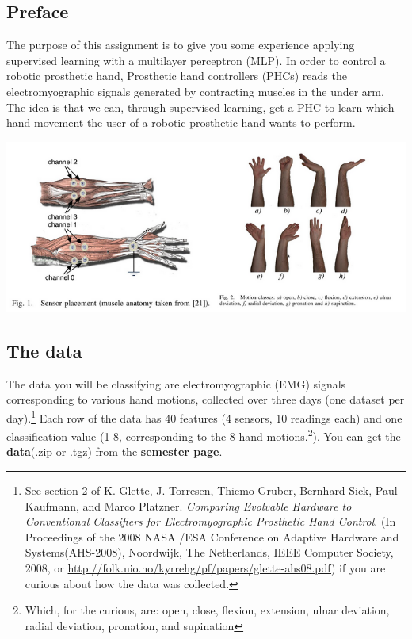 \documentclass{article}           %
\begin{document}
\subsection*{Preface}
The purpose of this assignment is to give you some experience applying supervised learning with a multilayer perceptron (MLP).
In order to control a robotic prosthetic hand, Prosthetic hand controllers (PHCs) reads the electromyographic signals generated by contracting muscles in the under arm.
The idea is that we can, through supervised learning, get a PHC to learn which hand movement the user of a robotic prosthetic hand wants to perform.

\begin{center}
    \includegraphics[scale=0.7]{figures/handfigures.png}
\end{center}

\subsection*{The data}
 The data you will be classifying
are electromyographic (EMG) signals corresponding to various hand
motions, collected over three days (one dataset per day).\footnote{
See section 2 of K. Glette, J. Torresen, Thiemo Gruber, Bernhard Sick,
Paul Kaufmann, and Marco Platzner. \emph{Comparing Evolvable Hardware
to Conventional Classifiers for Electromyographic Prosthetic Hand
Control}. (In Proceedings of the 2008 NASA /ESA Conference on Adaptive
Hardware and Systems(AHS-2008), Noordwijk, The Netherlands, IEEE Computer
Society, 2008, or \url{http://folk.uio.no/kyrrehg/pf/papers/glette-ahs08.pdf})
if you are curious about how the data was collected.
} Each row of the data has 40 features (4 sensors, 10 readings each) and one classification value (1-8, corresponding to
the 8 hand motions.\footnote{
Which, for the curious, are: open, close, flexion, extension, ulnar
deviation, radial deviation, pronation, and supination
}). You can get the \href{http://www.uio.no/studier/emner/matnat/ifi/INF3490/h16/assignment-2}{\textbf{data}}(.zip or .tgz) from the \href{http://www.uio.no/studier/emner/matnat/ifi/INF3490/h16/index.html}{\textbf{semester page}}.
\end{document}
